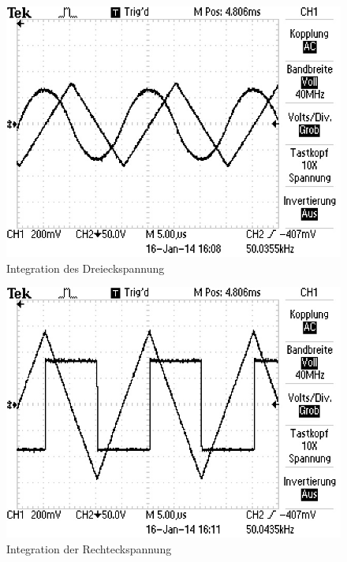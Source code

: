 	\begin{figure}[!h]
		\centering
		\includegraphics[scale=0.8]{Grafiken/Integrator_Dreieck.jpg}
		\caption{Integration des Dreieckspannung}
		\label{fig:Auswertung_Integrator_Dreieck}
	\end{figure}
	
	\begin{figure}[!h]
		\centering
		\includegraphics[scale=0.8]{Grafiken/Integrator_Rechteck.jpg}
		\caption{Integration der Rechteckspannung}
		\label{fig:Auswertung_Integrator_Rechteck}
	\end{figure}
	
